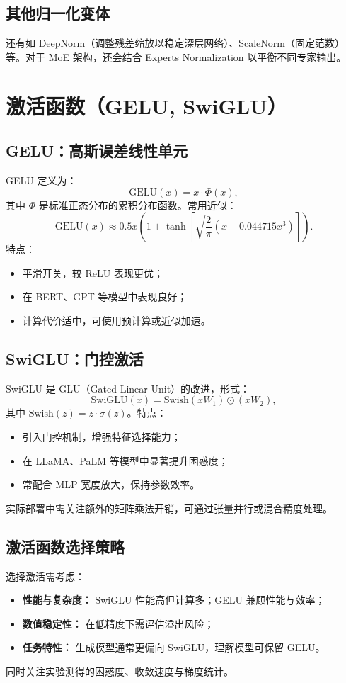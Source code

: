 \documentclass[UTF8,zihao=-4]{ctexart}
\begin{document}
\subsection{其他归一化变体}
还有如 DeepNorm（调整残差缩放以稳定深层网络）、ScaleNorm（固定范数）等。对于 MoE 架构，还会结合 Experts Normalization 以平衡不同专家输出。

\section{激活函数（GELU, SwiGLU）}
\subsection{GELU：高斯误差线性单元}
GELU 定义为：
\begin{equation}
  \mathrm{GELU}(x) = x \cdot \Phi(x),
\end{equation}
其中 $\Phi$ 是标准正态分布的累积分布函数。常用近似：
\begin{equation}
  \mathrm{GELU}(x) \approx 0.5 x \left(1 + \tanh\left[\sqrt{\frac{2}{\pi}} \left(x + 0.044715 x^3\right)\right]\right).
\end{equation}
特点：
\begin{itemize}
  \item 平滑开关，较 ReLU 表现更优；
  \item 在 BERT、GPT 等模型中表现良好；
  \item 计算代价适中，可使用预计算或近似加速。
\end{itemize}

\subsection{SwiGLU：门控激活}
SwiGLU 是 GLU（Gated Linear Unit）的改进，形式：
\begin{equation}
  \mathrm{SwiGLU}(x) = \mathrm{Swish}(x W_1) \odot (x W_2),
\end{equation}
其中 $\mathrm{Swish}(z) = z \cdot \sigma(z)$。特点：
\begin{itemize}
  \item 引入门控机制，增强特征选择能力；
  \item 在 LLaMA、PaLM 等模型中显著提升困惑度；
  \item 常配合 MLP 宽度放大，保持参数效率。
\end{itemize}
实际部署中需关注额外的矩阵乘法开销，可通过张量并行或混合精度处理。

\subsection{激活函数选择策略}
选择激活需考虑：
\begin{itemize}
  \item \textbf{性能与复杂度：} SwiGLU 性能高但计算多；GELU 兼顾性能与效率；
  \item \textbf{数值稳定性：} 在低精度下需评估溢出风险；
  \item \textbf{任务特性：} 生成模型通常更偏向 SwiGLU，理解模型可保留 GELU。
\end{itemize}
同时关注实验测得的困惑度、收敛速度与梯度统计。
\end{document}
